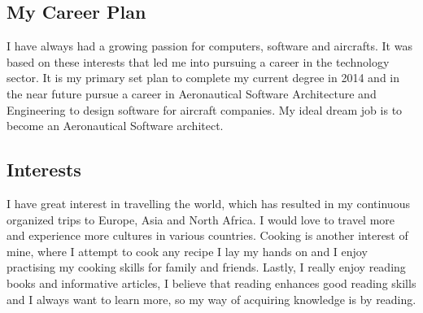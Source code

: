 	\subsection*{My Career Plan}
	
	I have always had a growing passion for computers, software and aircrafts. It was based on these interests that led me into pursuing a career in the technology sector. It is my primary set plan to complete my current degree in 2014 and in the near future pursue a career in Aeronautical Software Architecture and Engineering to design software for aircraft companies. My ideal dream job is to become an Aeronautical Software architect.

	\subsection*{Interests}
	
	I have great interest in travelling the world, which has resulted in my continuous organized trips to Europe, Asia and North Africa. I would love to travel more and experience more cultures in various countries. Cooking is another interest of mine, where I attempt to cook any recipe I lay my hands on and I enjoy practising my cooking skills for family and friends. Lastly, I really enjoy reading books and informative articles, I believe that reading enhances good reading skills and I always want to learn more, so my way of acquiring  knowledge is by reading. 

%